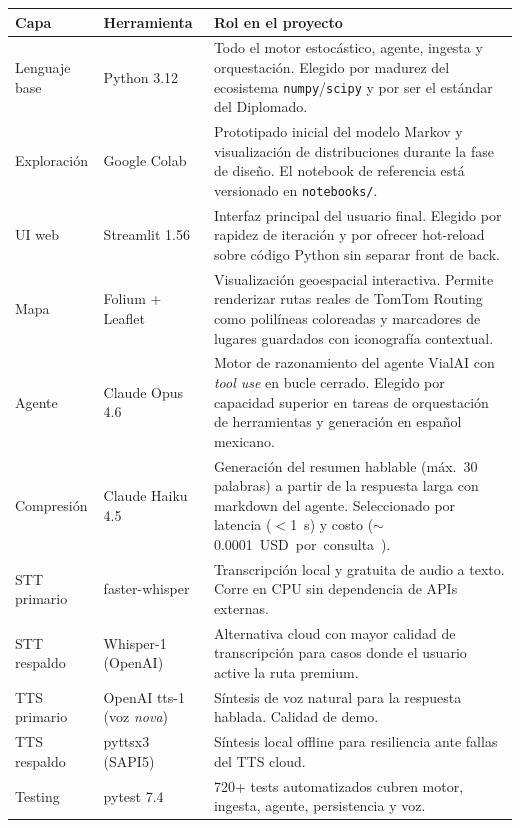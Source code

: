\documentclass[11pt,a4paper]{article}
\begin{document}
\begin{table}[H]
\centering
\small
\renewcommand{\arraystretch}{1.2}
\begin{tabularx}{\linewidth}{@{}l l X@{}}
\toprule
\rowcolor{vialNavy!10}
\textbf{Capa} & \textbf{Herramienta} & \textbf{Rol en el proyecto} \\
\midrule
Lenguaje base & Python \num{3.12} & Todo el motor estocástico, agente,
ingesta y orquestación. Elegido por madurez del ecosistema
\texttt{numpy}/\texttt{scipy} y por ser el estándar del Diplomado.\\
Exploración & Google Colab & Prototipado inicial del modelo Markov
y visualización de distribuciones durante la fase de diseño. El
notebook de referencia está versionado en \texttt{notebooks/}.\\
UI web & Streamlit \num{1.56} & Interfaz principal del usuario final.
Elegido por rapidez de iteración y por ofrecer hot-reload sobre
código Python sin separar front de back.\\
Mapa & Folium + Leaflet & Visualización geoespacial interactiva.
Permite renderizar rutas reales de TomTom Routing como polilíneas
coloreadas y marcadores de lugares guardados con iconografía
contextual.\\
Agente & Claude Opus \num{4.6} & Motor de razonamiento del agente
VialAI con \emph{tool use} en bucle cerrado. Elegido por capacidad
superior en tareas de orquestación de herramientas y generación en
español mexicano.\\
Compresión & Claude Haiku \num{4.5} & Generación del resumen
hablable (máx.\ \num{30} palabras) a partir de la respuesta larga
con markdown del agente. Seleccionado por latencia ($<$\SI{1}{s})
y costo ($\sim$\SI{0.0001}USD por consulta).\\
STT primario & faster-whisper & Transcripción local y gratuita
de audio a texto. Corre en CPU sin dependencia de APIs externas.\\
STT respaldo & Whisper-1 (OpenAI) & Alternativa cloud con mayor
calidad de transcripción para casos donde el usuario active la
ruta premium.\\
TTS primario & OpenAI tts-1 (voz \emph{nova}) & Síntesis de voz
natural para la respuesta hablada. Calidad de demo.\\
TTS respaldo & pyttsx3 (SAPI5) & Síntesis local offline para
resiliencia ante fallas del TTS cloud.\\
Testing & pytest \num{7.4} & \num{720}+ tests automatizados cubren
motor, ingesta, agente, persistencia y voz.\\

\end{tabularx}
\end{table}
\end{document}
